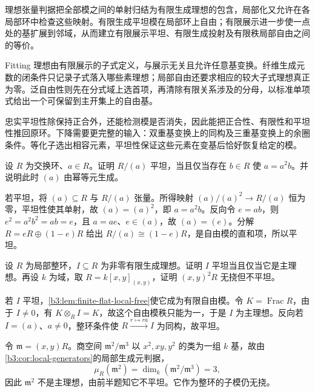 






\begin{chaptersummary}
	理想张量判据把全部模之间的单射归结为有限生成理想的包含，局部化又允许在各局部环中检查这些映射。有限生成平坦模在局部环上自由；有限展示进一步使一点处的基扩展到邻域，从而建立有限展示平坦、有限生成投射及有限秩局部自由之间的等价。

	\ProseParagraphBreak
	Fitting 理想由有限展示的子式定义，与展示无关且允许任意基变换。纤维生成元数的闭条件只记录子式落入哪些素理想；局部自由还要求相应的较大子式理想真正为零。泛自由性则先在分式域上选首项，再清除有限关系涉及的分母，以标准单项式给出一个可保留到主开集上的自由基。

	\ProseParagraphBreak
	忠实平坦性除保持正合外，还能检测模是否消失，因此能把正合性、有限性和平坦性推回原环。下降需要更完整的输入：双重基变换上的同构及三重基变换上的余圈条件。等化子选出相容元素，平坦性保证这些元素在变基后恰好恢复给定的模。
\end{chaptersummary}

\BookExercises

\begin{exercise}\label{b3:ex:12-flat-quotient-principal}
	设 \(R\) 为交换环、\(a\in R\)。证明 \(R/(a)\) 平坦，当且仅当存在 \(b\in R\) 使 \(a=a^2b\)。并说明此时 \((a)\) 由幂等元生成。
\end{exercise}
\begin{solution}
	若平坦，将 \((a)\subseteq R\) 与 \(R/(a)\) 张量。所得映射 \((a)/(a)^2\to R/(a)\) 恒为零，平坦性使其单射，故 \((a)=(a)^2\)，即 \(a=a^2b\)。反向令 \(e=ab\)，则 \(e^2=a^2b^2=ab=e\)，且 \(a=ae\)、\(e\in(a)\)，故 \((a)=(e)\)。分解 \(R=eR\oplus(1-e)R\) 给出 \(R/(a)\cong(1-e)R\)，是自由模的直和项，所以平坦。
\end{solution}

\begin{exercise}\label{b3:ex:12-torsion-flat-distinction}
	设 \(R\) 为局部整环，\(I\subseteq R\) 为非零有限生成理想。证明 \(I\) 平坦当且仅当它是主理想。再设 \(k\) 为域，取 \(R=k[x,y]_{(x,y)}\)，证明 \((x,y)^2R\) 无挠但不平坦。
\end{exercise}
\begin{solution}
	若 \(I\) 平坦，\cref{b3:lem:finite-flat-local-free}使它成为有限自由模。令 \(K=\operatorname{Frac}R\)，由于 \(I\ne0\)，有 \(K\otimes_RI=K\)，故这个自由模秩只能为一，于是 \(I\) 为主理想。反向若 \(I=(a)\)、\(a\ne0\)，整环条件使 \(R\xrightarrow{r\mapsto ra}I\) 为同构，故平坦。

	令 \(\mathfrak m=(x,y)R\)。商空间 \(\mathfrak m^2/\mathfrak m^3\) 以 \(x^2,xy,y^2\) 的类为一组 \(k\) 基，故由\cref{b3:cor:local-generators}的局部生成元判据，
	\[
		\mu_R(\mathfrak m^2)=\dim_k(\mathfrak m^2/\mathfrak m^3)=3,
	\]
	因此 \(\mathfrak m^2\) 不是主理想，由前半题知它不平坦。它作为整环的子模仍无挠。
\end{solution}

